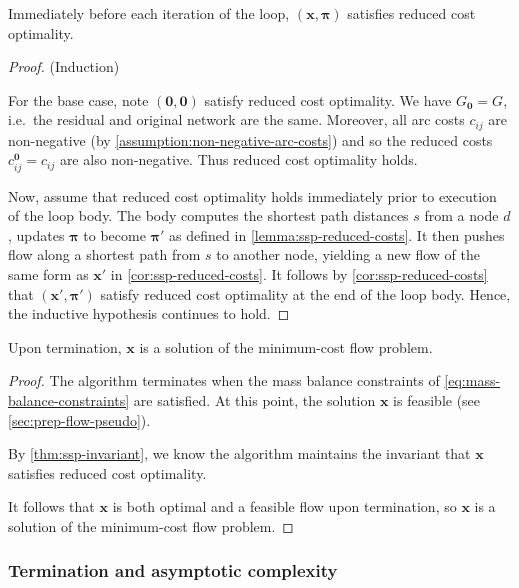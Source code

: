 \begin{thm} \label{thm:ssp-invariant}
Immediately before each iteration of the loop, $(\mathbf{x},\boldsymbol{\pi})$ satisfies reduced cost optimality.
\end{thm}
\begin{proof} (Induction)

For the base case, note $(\mathbf{0},\mathbf{0})$ satisfy reduced cost optimality. We have $G_{\boldsymbol{0}} = G$, i.e.\ the residual and original network are the same. Moreover, all arc costs $c_{ij}$ are non-negative (by \cref{assumption:non-negative-arc-costs}) and so the reduced costs $c^{\boldsymbol{0}}_{ij}=c_{ij}$ are also non-negative. Thus reduced cost optimality holds.

Now, assume that reduced cost optimality holds immediately prior to execution of the loop body. The body computes the shortest path distances $s$ from a node $d$, updates $\boldsymbol{\pi}$ to become $\boldsymbol{\pi'}$ as defined in \cref{lemma:ssp-reduced-costs}. It then pushes flow along a shortest path from $s$ to another node, yielding a new flow of the same form as $\mathbf{x'}$ in \cref{cor:ssp-reduced-costs}. It follows by \cref{cor:ssp-reduced-costs} that $(\mathbf{x}',\boldsymbol{\pi}')$ satisfy reduced cost optimality at the end of the loop body. Hence, the inductive hypothesis continues to hold.
\end{proof}

\begin{cor} \label{cor:ssp-correctness}
Upon termination, $\mathbf{x}$ is a solution of the minimum-cost flow problem.
\end{cor}
\begin{proof}
The algorithm terminates when the mass balance constraints of \cref{eq:mass-balance-constraints} are satisfied. At this point, the solution $\mathbf{x}$ is feasible (see \cref{sec:prep-flow-pseudo}). 

By \cref{thm:ssp-invariant}, we know the algorithm maintains the invariant that $\mathbf{x}$ satisfies reduced cost optimality. 

It follows that $\mathbf{x}$ is both optimal and a feasible flow upon termination, so $\mathbf{x}$ is a solution of the minimum-cost flow problem.
\end{proof}

\subsubsection{Termination and asymptotic complexity}

